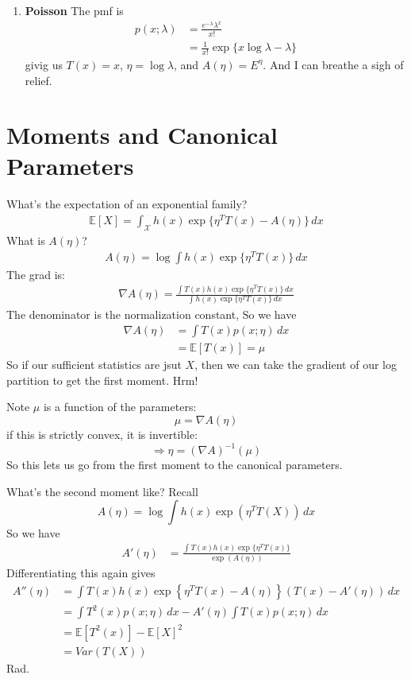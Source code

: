 \documentclass{article}
\newcommand{\E}{\mathbb{E}}
\newcommand{\inv}{^{-1}}
\begin{document}
\begin{enumerate}
	
	\item
	\textbf{Poisson}
	The pmf is
	\begin{align}
	p(x;\lambda)
	&=
	\frac{e^{-\lambda} \lambda^x}{ x!}
	\\
	&=
	\frac{1}{x!} \exp\{
	x\log \lambda - \lambda
	\}
	\end{align}
	givig us
	$T(x) = x$, $\eta = \log \lambda$, and $A(\eta) = E^\eta$.
	And I can breathe a sigh of relief.
	
	
	
\end{enumerate}




\section{Moments and Canonical Parameters}

What's the expectation of an exponential family?
\begin{align*}
\E[X] = 
\int_{\mathcal X}
h(x) \exp\{
\eta^TT(x) - A(\eta)
\}
\, dx
\end{align*}
What is $A(\eta)$?
\begin{align*}
A(\eta) =
\log
\int
h(x) \exp\{
	\eta^T T(x)
\}
\, dx
\end{align*}
The grad is:
\begin{align*}
\nabla
A(\eta) =
\frac
{
\int T(x) h(x) \exp\{\eta^T T(x)\} \, dx
}
{
\int
h(x) \exp\{
	\eta^T T(x)
\}
\, dx
}
\end{align*}
The denominator is the normalization constant, So we have
\begin{align*}
\nabla
A(\eta) &=
\int
T(x) p(x;\eta)
\, dx
\\
&=
\E[T(x)]
= \mu
\end{align*}
So if our sufficient statistics are jsut $X$, then we can take the gradient of our log partition to get the first moment.
Hrm!

Note $\mu$ is a function of the parameters:
$$
\mu = \nabla A(\eta)
$$
if this is strictly convex, it is invertible:
$$
\Rightarrow
\eta = (\nabla A)\inv (\mu)
$$
So this lets us go from the first moment to the canonical parameters.

What's the second moment like? 
Recall
$$
A(\eta)
=
\log
\int
h(x) \exp(\eta^T T(X))
\,
dx
$$
So we have
\begin{align*}
A'(\eta)
&=
\frac
{\int T(x) h(x) \exp\{ \eta^T T(x)\}
}
{\exp(A(\eta))}
\end{align*}
Differentiating this again gives
\begin{align*}
A''(\eta)
&=
\int
T(x)
h(x)
\exp
\left\{
\eta^T T(x) - A(\eta)
\right\}
(T(x) - A'(\eta))
\,
dx
\\
&=
\int
T^2(x)
p(x;\eta)
\,
dx
-
A'(\eta)
\int
T(x) p(x;\eta)\, dx
\\
&=
\E[
T^2(x)
]
- \E[X]^2
\\
&=
Var(T(X))
\end{align*}
Rad. 
\end{document}
